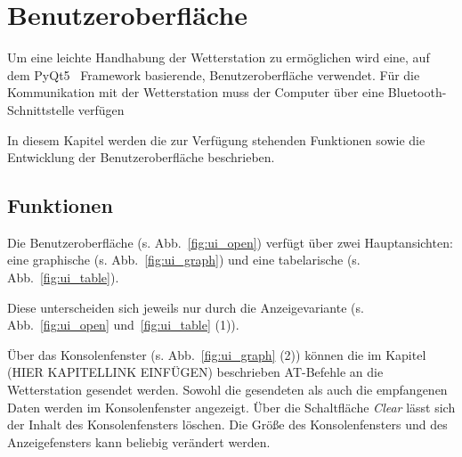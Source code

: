\section{Benutzeroberfläche}\label{sec:benutzeroberflaeche}
Um eine leichte Handhabung der Wetterstation zu ermöglichen wird eine, auf dem PyQt5~\cite{pyqt5} Framework basierende, Benutzeroberfläche verwendet. Für die Kommunikation mit der Wetterstation muss der Computer über eine Bluetooth-Schnittstelle verfügen

In diesem Kapitel werden die zur Verfügung stehenden Funktionen sowie die Entwicklung der Benutzeroberfläche beschrieben.

\subsection{Funktionen}\label{sec:bo_funktionen}
Die Benutzeroberfläche (s. Abb.~\ref{fig:ui_open}) verfügt über zwei Hauptansichten: eine graphische (s. Abb.~\ref{fig:ui_graph}) und eine tabelarische (s. Abb.~\ref{fig:ui_table}).

Diese unterscheiden sich jeweils nur durch die Anzeigevariante (s. Abb.~\ref{fig:ui_open} und~\ref{fig:ui_table} (1)).

Über das Konsolenfenster (s. Abb.~\ref{fig:ui_graph} (2)) können die im Kapitel (HIER KAPITELLINK EINFÜGEN) beschrieben AT-Befehle an die Wetterstation gesendet werden. Sowohl die gesendeten als auch die empfangenen Daten werden im Konsolenfenster angezeigt. Über die Schaltfläche \emph{Clear} lässt sich der Inhalt des Konsolenfensters löschen. Die Größe des Konsolenfensters und des Anzeigefensters kann beliebig verändert werden.

